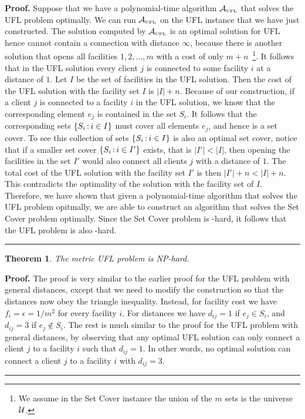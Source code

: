 \documentclass[oneside,final]{ucr}
\newtheorem{theorem}{Theorem}
\newenvironment{proof}[1][Proof]{\textbf{#1.} }{\ \rule{0.5em}{0.5em}}
\begin{document}
\begin{proof}
  Suppose that we have a polynomial-time algorithm
  $\calA_{\smallUFL}$ that solves the UFL problem
  optimally. We can run $\calA_{\smallUFL}$ on the UFL
  instance that we have just constructed. The solution
  computed by $\calA_{\smallUFL}$ is an optimal solution for
  UFL hence cannot contain a connection with distance
  $\infty$, because there is another solution that opens all
  facilities $1,2,\ldots,m$ with a cost of only
  $m+n$~\footnote{We assume in the Set Cover instance the
    union of the $m$ sets is the universe $\calU$.}. It
  follows that in the UFL solution every client $j$ is
  connected to some facility $i$ at a distance of $1$. Let
  $I$ be the set of facilities in the UFL solution. Then the
  cost of the UFL solution with the facility set $I$ is $|I|
  + n$. Because of our construction, if a client $j$ is
  connected to a facility $i$ in the UFL solution, we know
  that the corresponding element $e_j$ is contained in the
  set $S_i$. It follows that the corresponding sets $\{S_i
  {\,:\,} i \in I\}$ must cover all elements $e_j$, and
  hence is a set cover. To see this collection of sets
  $\{S_i {\,:\,} i \in I\}$ is also an optimal set cover,
  notice that if a smaller set cover $\{S_i {\,:\,} i \in
  I'\}$ exists, that is $|I'| < |I|$, then opening the
  facilities in the set $I'$ would also connect all clients
  $j$ with a distance of $1$. The total cost of the UFL
  solution with the facility set $I'$ is then $|I'| + n <
  |I| + n$. This contradicts the optimality of the solution
  with the facility set of $I$. Therefore, we have shown
  that given a polynomial-time algorithm that solves the UFL
  problem opitmally, we are able to construct an algorithm
  that solves the Set Cover problem optimally. Since the Set
  Cover problem is \NP-hard, it follows that the UFL problem
  is also \NP-hard.
\end{proof}

\begin{theorem} \label{thm:metricNP}
  The metric UFL problem is NP-hard.
\end{theorem}
\begin{proof}
  The proof is very similar to the earlier proof for the UFL
  problem with general distances, except that we need to
  modify the construction so that the distances now obey the
  triangle inequality. Instead, for facility cost we have
  $f_i = \epsilon = 1/m^2$ for every facility $i$. For
  distances we have $d_{ij} = 1$ if $e_j \in S_i$, and
  $d_{ij} = 3$ if $e_j \notin S_i$. The rest is much similar
  to the proof for the UFL problem with general distances,
  by observing that any optimal UFL solution can only
  connect a client $j$ to a facility $i$ such that $d_{ij} =
  1$. In other words, no optimal solution can connect a
  client $j$ to a facility $i$ with $d_{ij} = 3$.
\end{proof}
\end{document}
